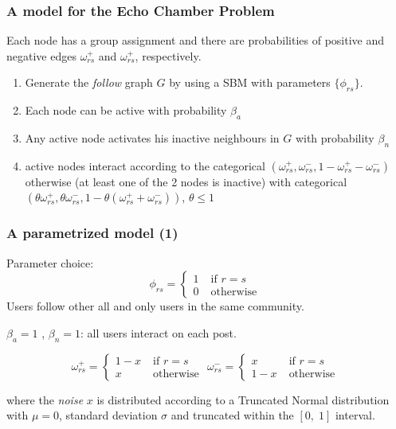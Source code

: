 \documentclass{beamer}
\begin{document}
\begin{frame}[c]
	\frametitle{A model for the Echo Chamber Problem}
	Each node has a group assignment and there are probabilities of
	positive and negative edges $\omega _{rs}^{+}  $ and $\omega _{rs}^{+}  $,
	respectively.

	\begin{enumerate}
		\item Generate the \emph{follow} graph $G$ by using a SBM with parameters
		      $\{ \phi _{rs}  \}$.
		\item Each node can be active with probability $\beta_{a}  $
		\item Any active node activates his inactive neighbours in $G$ with
		      probability $\beta_n$
		\item active nodes interact according to the categorical $(\omega _{rs}
			      ^{+}, \omega _{rs} ^{-}, 1 - \omega _{rs} ^{+} - \omega _{rs} ^{-})
		      $ otherwise (at least one of the 2 nodes is inactive) with
		      categorical $(\theta \omega _{rs} ^{+}, \theta \omega _{rs} ^{-}, 1
			      - \theta (\omega _{rs} ^{+} + \omega _{rs} ^{-}))$, $\theta \leq 1$
	\end{enumerate}

\end{frame}

\begin{frame}[c]
	\frametitle{A parametrized model (1)}
	Parameter choice:
	\begin{equation}
		\phi_{rs}  =
		\begin{cases}
			1 \; & \text{if } r = s  \\
			0 \; & \text{otherwise }
		\end{cases}
	\end{equation}
	Users follow other all and only users in the same community.

	\bigskip

	$\beta _{a} = 1$ , $\beta_{n} = 1 $: all users interact on each post.

	\begin{equation}
		\omega_{rs}^{+}   =
		\begin{cases}
			1 - x \; & \text{if } r = s  \\
			x \;     & \text{otherwise }
		\end{cases}
		\omega_{rs}^{-}   =
		\begin{cases}
			x \;     & \text{if } r = s  \\
			1 - x \; & \text{otherwise }
		\end{cases}
	\end{equation}

	where the \emph{noise} $x$ is distributed according to a Truncated Normal distribution with $\mu = 0$,
	standard deviation $\sigma$ and truncated within the $[0, \; 1]$ interval.

\end{frame}
\end{document}

